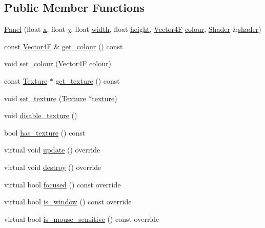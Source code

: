 \subsection*{Public Member Functions}
\begin{DoxyCompactItemize}
\item 
\mbox{\hyperlink{class_panel_aafa4aa5f39fb3f832e2f1585ecbce0e9}{Panel}} (float \mbox{\hyperlink{class_g_u_i_a7fa193a8ffb27bbb3bcc225e36f6d54d}{x}}, float \mbox{\hyperlink{class_g_u_i_a98f204f99ffc5ff6cffc9340bbb8c29b}{y}}, float \mbox{\hyperlink{class_g_u_i_aee5d8766834f6f743f0d8b8c16e47155}{width}}, float \mbox{\hyperlink{class_g_u_i_a70b578c36323a45cac88ccff3bced933}{height}}, \mbox{\hyperlink{class_vector4}{Vector4F}} \mbox{\hyperlink{class_panel_a7c38e08ad80eb9972428450fb639bf66}{colour}}, \mbox{\hyperlink{class_shader}{Shader}} \&\mbox{\hyperlink{class_g_u_i_a64b007b31d0ec8a8704f9ab3bb2a7d3d}{shader}})
\item 
const \mbox{\hyperlink{class_vector4}{Vector4F}} \& \mbox{\hyperlink{class_panel_ace1342ef6e7c0f73a44e380356ce5e28}{get\+\_\+colour}} () const
\item 
void \mbox{\hyperlink{class_panel_af23b45cbf03066f1a1d884486ca00712}{set\+\_\+colour}} (\mbox{\hyperlink{class_vector4}{Vector4F}} \mbox{\hyperlink{class_panel_a7c38e08ad80eb9972428450fb639bf66}{colour}})
\item 
const \mbox{\hyperlink{class_texture}{Texture}} $\ast$ \mbox{\hyperlink{class_panel_a938f8a6b4038c5ebd43468ff7c6279c6}{get\+\_\+texture}} () const
\item 
void \mbox{\hyperlink{class_panel_aecd67bfb730ba8e0afd331b5c25c0e83}{set\+\_\+texture}} (\mbox{\hyperlink{class_texture}{Texture}} $\ast$\mbox{\hyperlink{class_panel_a682c2d8747451954095eb567b45d3fbd}{texture}})
\item 
void \mbox{\hyperlink{class_panel_a126b9ac55e35e3530f01614f285e0eea}{disable\+\_\+texture}} ()
\item 
bool \mbox{\hyperlink{class_panel_a3df9165a8d21073e92090937122a790b}{has\+\_\+texture}} () const
\item 
virtual void \mbox{\hyperlink{class_panel_a9e9c0608cf3139833cde6b73dc3ba443}{update}} () override
\item 
virtual void \mbox{\hyperlink{class_panel_ac21884693c47ee069feb9e963f00e9af}{destroy}} () override
\item 
virtual bool \mbox{\hyperlink{class_panel_ace2217419ea5c2e98a38678c6e2012e1}{focused}} () const override
\item 
virtual bool \mbox{\hyperlink{class_panel_a9a30fff40fad1f0845c0c7aa2786f772}{is\+\_\+window}} () const override
\item 
virtual bool \mbox{\hyperlink{class_panel_a607fe6e1be6fd056f199fa817a4dedda}{is\+\_\+mouse\+\_\+sensitive}} () const override
\end{DoxyCompactItemize}
